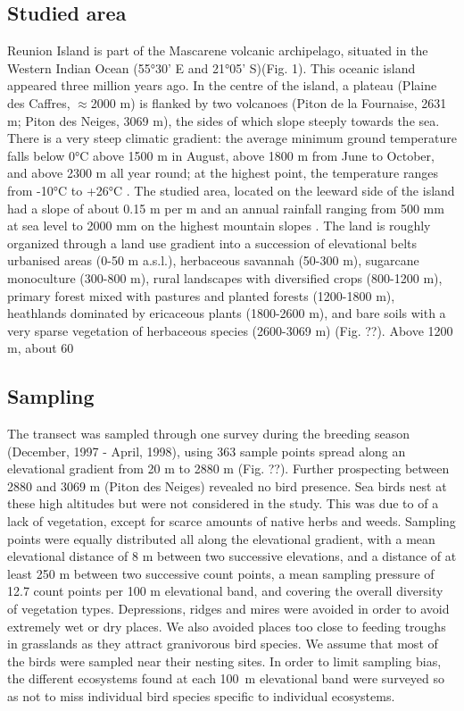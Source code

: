 \documentclass{article}
\begin{document}
\subsection{Studied area}
Reunion Island is part of the Mascarene volcanic archipelago, situated in the Western Indian Ocean (55°30’ E and 21°05’ S)(Fig. 1). This oceanic island appeared three million years ago. In the centre of the island, a plateau (Plaine des Caffres, $\approx$2000 m) is flanked by two volcanoes (Piton de la Fournaise, 2631 m; Piton des Neiges, 3069 m), the sides of which slope steeply towards the sea. There is a very steep climatic gradient: the average minimum ground temperature falls below 0°C above 1500 m in August, above 1800 m from June to October, and above 2300 m all year round; at the highest point, the temperature ranges from -10°C to +26°C \citep{Cadet1974,Raunet1991}.
The studied area, located on the leeward side of the island had a slope of about 0.15 m per m and an annual rainfall ranging from 500 mm at sea level to 2000 mm on the highest mountain slopes \cite{Raunet1991}. The land is roughly organized through a land use gradient into a succession of elevational belts \citep{Cadet1980} urbanised areas (0-50 m a.s.l.), herbaceous savannah (50-300 m), sugarcane monoculture (300-800 m), rural landscapes with diversified crops (800-1200 m), primary forest mixed with pastures and planted forests (1200-1800 m), heathlands dominated by ericaceous plants (1800-2600 m), and bare soils with a very sparse vegetation of herbaceous species (2600-3069 m) (Fig. ??). Above 1200 m, about 60 %

\subsection{Sampling}


The transect was sampled through one survey during the breeding season (December, 1997 - April, 1998), using 363 sample points spread along an elevational gradient from 20 m to 2880 m (Fig. ??). Further prospecting between 2880 and 3069 m (Piton des Neiges) revealed no bird presence. Sea birds nest at these high altitudes but were not considered in the study. This was due to of a lack of vegetation, except for scarce amounts of native herbs and weeds. Sampling points were equally distributed all along the elevational gradient, with a mean elevational distance of 8 m between two successive elevations, and a distance of at least 250 m between two successive count points, a mean sampling pressure of 12.7 count points per 100 m elevational band, and covering the overall diversity of vegetation types. Depressions, ridges and mires were avoided in order to avoid extremely wet or dry places. We also avoided places too close to feeding troughs in grasslands as they attract granivorous bird species. We assume that most of the birds were sampled near their nesting sites. In order to limit sampling bias, the different ecosystems found at each 100~m elevational band were surveyed so as not to miss individual bird species specific to individual ecosystems. 
\end{document}
